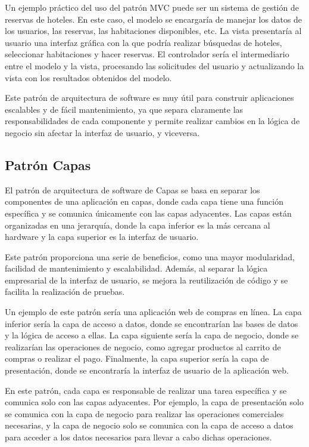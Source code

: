 \documentclass[executivepaper]{article}
\begin{document}
Un ejemplo práctico del uso del patrón MVC puede ser un sistema de gestión de reservas de hoteles. En este caso, el modelo se encargaría de manejar los datos de los usuarios, las reservas, las habitaciones disponibles, etc. La vista presentaría al usuario una interfaz gráfica con la que podría realizar búsquedas de hoteles, seleccionar habitaciones y hacer reservas. El controlador sería el intermediario entre el modelo y la vista, procesando las solicitudes del usuario y actualizando la vista con los resultados obtenidos del modelo.

Este patrón de arquitectura de software es muy útil para construir aplicaciones escalables y de fácil mantenimiento, ya que separa claramente las responsabilidades de cada componente y permite realizar cambios en la lógica de negocio sin afectar la interfaz de usuario, y viceversa.

\subsection{Patrón Capas}

El patrón de arquitectura de software de Capas se basa en separar los componentes de una aplicación en capas, donde cada capa tiene una función específica y se comunica únicamente con las capas adyacentes. Las capas están organizadas en una jerarquía, donde la capa inferior es la más cercana al hardware y la capa superior es la interfaz de usuario.

Este patrón proporciona una serie de beneficios, como una mayor modularidad, facilidad de mantenimiento y escalabilidad. Además, al separar la lógica empresarial de la interfaz de usuario, se mejora la reutilización de código y se facilita la realización de pruebas.

Un ejemplo de este patrón sería una aplicación web de compras en línea. La capa inferior sería la capa de acceso a datos, donde se encontrarían las bases de datos y la lógica de acceso a ellas. La capa siguiente sería la capa de negocio, donde se realizarían las operaciones de negocio, como agregar productos al carrito de compras o realizar el pago. Finalmente, la capa superior sería la capa de presentación, donde se encontraría la interfaz de usuario de la aplicación web.

En este patrón, cada capa es responsable de realizar una tarea específica y se comunica solo con las capas adyacentes. Por ejemplo, la capa de presentación solo se comunica con la capa de negocio para realizar las operaciones comerciales necesarias, y la capa de negocio solo se comunica con la capa de acceso a datos para acceder a los datos necesarios para llevar a cabo dichas operaciones.
\end{document}
